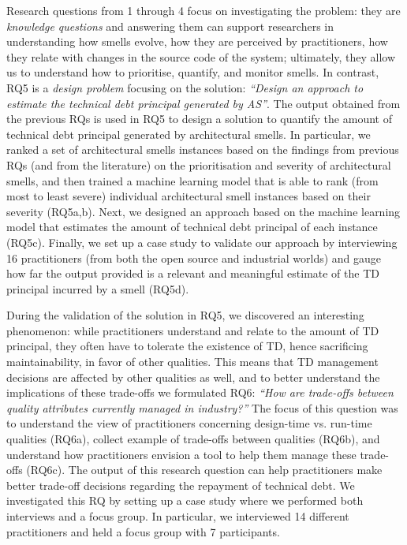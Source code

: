 Research questions from 1 through 4 focus on investigating the problem: they are \emph{knowledge questions} and answering them can support researchers in understanding how smells evolve, how they are perceived by practitioners, how they relate with changes in the source code of the system; ultimately, they allow us to understand how to prioritise, quantify, and monitor smells.
In contrast, RQ5 is a \emph{design problem} focusing on the solution: \textit{``Design an approach to estimate the technical debt principal generated by AS''}.
The output obtained from the previous RQs is used in RQ5 to design a solution to quantify the amount of technical debt principal generated by architectural smells.
In particular, we ranked a set of architectural smells instances based on the findings from previous RQs (and from the literature) on the prioritisation and severity of architectural smells, and then trained a machine learning model that is able to rank (from most to least severe) individual architectural smell instances based on their severity (RQ5a,b).
Next, we designed an approach based on the machine learning model that estimates the amount of technical debt principal of each instance (RQ5c).
Finally, we set up a case study to validate our approach by interviewing 16 practitioners (from both the open source and industrial worlds) and gauge how far the output provided is a relevant and meaningful estimate of the TD principal incurred by a smell (RQ5d).

During the validation of the solution in RQ5, we discovered an interesting phenomenon: while practitioners understand and relate to the amount of TD principal, they often have to tolerate the existence of TD, hence sacrificing maintainability, in favor of other qualities.
This means that TD management decisions are affected by other qualities as well, and to better understand the implications of these trade-offs we formulated RQ6: \textit{``How are trade-offs between quality attributes currently managed in industry?''}
The focus of this question was to understand the view of practitioners concerning design-time vs. run-time qualities (RQ6a), collect example of trade-offs between qualities (RQ6b), and understand how practitioners envision a tool to help them manage these trade-offs (RQ6c). 
The output of this research question can help practitioners make better trade-off decisions regarding the repayment of technical debt.
We investigated this RQ by setting up a case study where we performed both interviews and a focus group.
In particular, we interviewed 14 different practitioners and held a focus group with 7 participants.


